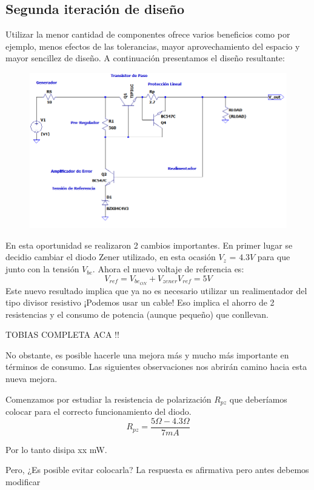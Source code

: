 \subsection{Segunda iteración de diseño}
Utilizar la menor cantidad de componentes ofrece varios beneficios como por ejemplo, menos efectos de las tolerancias, mayor aprovechamiento del espacio y mayor sencillez de diseño.
A continuación presentamos el diseño resultante:
\begin{figure}[H]
	\centering
	\includegraphics[width=0.7\linewidth]{ImagenesEjercicio1/ImagenCircuitoFL}
	\caption{}
	\label{fig:imagencircuitofl}
\end{figure}
En esta oportunidad se realizaron 2 cambios importantes. En primer lugar se decidio cambiar el diodo Zener utilizado, en esta ocasión $V_z$ = $4.3V$ para que junto con la tensión $V_{be}$.
Ahora el nuevo voltaje de referencia es:
\begin{equation}
	V_{ref} = V_{be_{ON}} + V_{zener}
	V_{ref} = 5V
\end{equation}
Este nuevo resultado implica que ya no es necesario utilizar un realimentador del tipo divisor resistivo ¡Podemos usar un cable! Eso implica el ahorro de 2 resistencias y el consumo de potencia (aunque pequeño) que conllevan.


TOBIAS COMPLETA ACA !!

No obstante, es posible hacerle una mejora más y mucho más importante en términos de consumo. Las siguientes observaciones nos abrirán camino hacia esta nueva mejora.

Comenzamos por estudiar la resistencia de polarización $R_{pz}$ que deberíamos colocar para el correcto funcionamiento del diodo.
\begin{equation}
	R_{pz} = \frac{5\Omega-4.3\Omega}{7mA}
\end{equation}


Por lo tanto disipa xx mW.

Pero, ¿Es posible evitar colocarla? La respuesta es afirmativa pero antes debemos modificar


